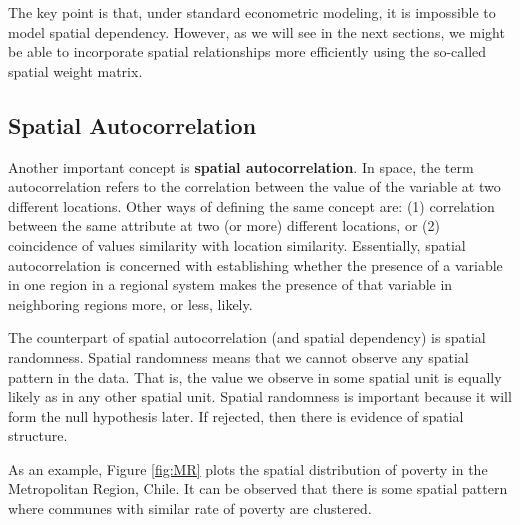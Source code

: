 The key point is that, under standard econometric modeling, it is impossible to model spatial dependency. However, as we will see in the next sections, we might be able to incorporate spatial relationships more efficiently using the so-called spatial weight matrix. 

\subsection{Spatial Autocorrelation}\label{sec:Spatial_autocorrelation}

Another important concept is \textbf{spatial autocorrelation}. In space, the term autocorrelation refers to the correlation between the value of the variable at two different locations. Other ways of defining the same concept are: (1) correlation between the same attribute at two (or more) different locations, or (2) coincidence of values similarity with location similarity. Essentially, spatial autocorrelation is concerned with establishing whether the presence of a variable in one region in a regional system makes the presence of that variable in neighboring regions more, or less, likely.

The counterpart of spatial autocorrelation (and spatial dependency) is spatial randomness.  Spatial randomness means that we cannot observe any spatial pattern in the data. That is, the value we observe in some spatial unit is equally likely as in any other spatial unit. Spatial randomness is important because it will form the null hypothesis later. If rejected, then there is evidence of spatial structure.  

As an example, Figure \ref{fig:MR} plots the spatial distribution of poverty in the Metropolitan Region, Chile. It can be observed that there is some spatial pattern where communes with similar rate of poverty are clustered. 

